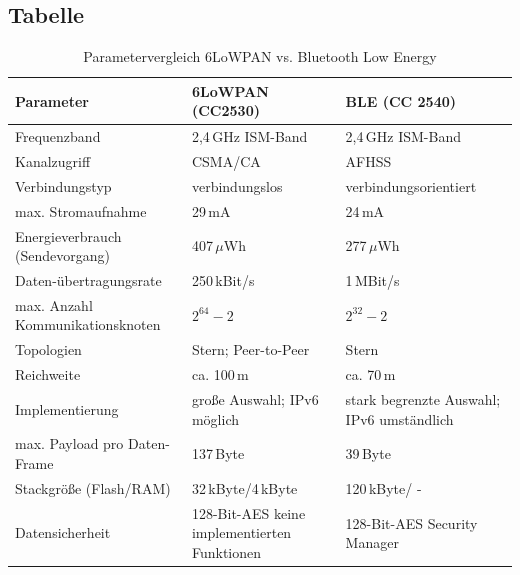 \newpage

\subsection{Tabelle}

\begin{table}[!ht]
  \centering  
  \begin{tabular}{|p{3cm}||p{4cm}|p{4cm}|}
    \hline \textbf{Parameter} & \textbf{6LoWPAN (CC2530)} & \textbf{BLE (CC
2540)} \\ 
    \hline
    \hline Frequenzband & 2,4\,GHz ISM-Band & 2,4\,GHz ISM-Band \\
    \hline Kanalzugriff & CSMA/CA & AFHSS \\
    \hline Verbindungstyp & verbindungslos & verbindungsorientiert \\
    \hline max. Stromaufnahme & \vspace{1pt}29\,mA & \vspace{1pt}24\,mA \\ 
    \hline Energieverbrauch (Sendevorgang) & \vspace{1pt}407\,$\mu$Wh &
\vspace{1pt}277\,$\mu$Wh \\ 
    \hline Daten-übertragungsrate & \vspace{1pt}250\,kBit/s &
\vspace{1pt}1\,MBit/s \\
    \hline max. Anzahl Kommunikationsknoten & \vspace{1pt}$2^{64}-2$ &
\vspace{1pt}$2^{32}-2$ \\
    \hline Topologien & Stern; Peer-to-Peer & Stern \\
    \hline Reichweite & ca. 100\,m & ca. 70\,m \\
    \hline Implementierung & große Auswahl; IPv6 möglich & stark begrenzte
Auswahl; IPv6 umständlich \\
    \hline max. Payload pro Daten-Frame & \vspace{1pt}137\,Byte &
\vspace{1pt}39\,Byte \\
    \hline Stackgröße (Flash/RAM) & \vspace{0.5pt}32\,kByte/4\,kByte &
\vspace{0.5pt}120\,kByte/ - \\
    \hline Datensicherheit & 128-Bit-AES keine implementierten Funktionen &
128-Bit-AES Security Manager \\
    \hline
  \end{tabular}
  \caption{Parametervergleich 6LoWPAN vs. Bluetooth Low Energy}\label{tab:ver}
\end{table}

